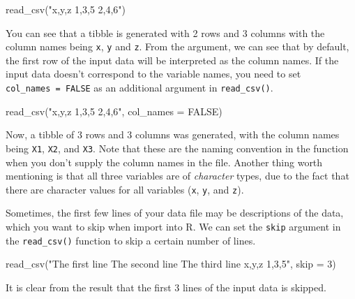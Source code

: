 \documentclass[
]{book}
\newenvironment{Shaded}{\begin{snugshade}}{\end{snugshade}}
\newcommand{\AttributeTok}[1]{\textcolor[rgb]{0.77,0.63,0.00}{#1}}
\newcommand{\ConstantTok}[1]{\textcolor[rgb]{0.00,0.00,0.00}{#1}}
\newcommand{\DecValTok}[1]{\textcolor[rgb]{0.00,0.00,0.81}{#1}}
\newcommand{\FunctionTok}[1]{\textcolor[rgb]{0.00,0.00,0.00}{#1}}
\newcommand{\NormalTok}[1]{#1}
\newcommand{\StringTok}[1]{\textcolor[rgb]{0.31,0.60,0.02}{#1}}
\begin{document}
\begin{Shaded}
\begin{Highlighting}[]
\FunctionTok{read\_csv}\NormalTok{(}\StringTok{"x,y,z}
\StringTok{          1,3,5}
\StringTok{          2,4,6"}\NormalTok{)}
\end{Highlighting}
\end{Shaded}

You can see that a tibble is generated with 2 rows and 3 columns with the column names being \texttt{x}, \texttt{y} and \texttt{z}. From the argument, we can see that by default, the first row of the input data will be interpreted as the column names. If the input data doesn't correspond to the variable names, you need to set \texttt{col\_names\ =\ FALSE} as an additional argument in \texttt{read\_csv()}.

\begin{Shaded}
\begin{Highlighting}[]
\FunctionTok{read\_csv}\NormalTok{(}\StringTok{"x,y,z}
\StringTok{          1,3,5}
\StringTok{          2,4,6"}\NormalTok{, }\AttributeTok{col\_names =} \ConstantTok{FALSE}\NormalTok{)}
\end{Highlighting}
\end{Shaded}

Now, a tibble of 3 rows and 3 columns was generated, with the column names being \texttt{X1}, \texttt{X2}, and \texttt{X3}. Note that these are the naming convention in the function when you don't supply the column names in the file. Another thing worth mentioning is that all three variables are of \emph{character} types, due to the fact that there are character values for all variables (\texttt{x}, \texttt{y}, and \texttt{z}).

Sometimes, the first few lines of your data file may be descriptions of the data, which you want to skip when import into R. We can set the \texttt{skip} argument in the \texttt{read\_csv()} function to skip a certain number of lines.

\begin{Shaded}
\begin{Highlighting}[]
\FunctionTok{read\_csv}\NormalTok{(}\StringTok{"The first line }
\StringTok{          The second line}
\StringTok{          The third line}
\StringTok{          x,y,z}
\StringTok{          1,3,5"}\NormalTok{, }\AttributeTok{skip =} \DecValTok{3}\NormalTok{)}
\end{Highlighting}
\end{Shaded}

It is clear from the result that the first 3 lines of the input data is skipped.
\end{document}
